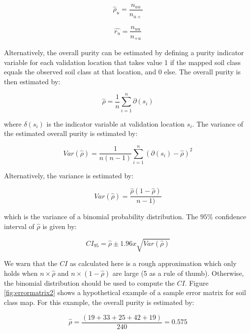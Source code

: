 \documentclass[10pt,b5paper,]{book}
\theoremstyle{definition}
\theoremstyle{definition}
\theoremstyle{definition}
\theoremstyle{remark}
\begin{document}
\begin{equation}
\hat{\rho}_u = \frac{ n_{uu}}{n_{u+}}
\end{equation}

\begin{equation}
\hat{r_u} = \frac{ n_{uu}}{n_{+u}}
\end{equation}

Alternatively, the overall purity can be estimated by defining a purity
indicator variable for each validation location that takes value 1 if
the mapped soil class equals the observed soil class at that location,
and 0 else. The overall purity is then estimated by:

\begin{equation}
\hat{\rho} = \frac{1}{n} \sum_{i=1}^{n} \partial(s_i)
\end{equation}

where \({\delta(s_i)}\) is the indicator variable at validation location
\(s_i\). The variance of the estimated overall purity is estimated by:

\begin{equation}
Var(\hat{\rho}) = \frac{1}{n(n-1)} \sum_{i=1}^{n} (\partial(s_i) - \hat{\rho})^2
\end{equation}

Alternatively, the variance is estimated by:

\begin{equation}
Var(\hat{\rho}) = \frac{\hat{\rho}(1 - \hat{\rho})}{n - 1)}
\end{equation}

which is the variance of a binomial probability distribution. The
\(95\%\) confidence interval of \(\hat{\rho}\) is given by:

\begin{equation}
CI_{95} = \hat{\rho} \pm 1.96x \sqrt{Var(\hat{\rho})}
\end{equation}

We warn that the \(CI\) as calculated here is a rough approximation
which only holds when \(n \times \hat{\rho}\) and
\(n \times (1 - \hat{\rho})\) are large (5 as a rule of thumb).
Otherwise, the binomial distribution should be used to compute the
\(CI\). Figure \ref{fig:errormatrix2} shows a hypothetical example of a
sample error matrix for soil class map. For this example, the overall
purity is estimated by:

\begin{equation}
\hat{\rho} = \frac{(19 + 33 + 25 + 42 + 19)}{240} = 0.575
\end{equation}
\end{document}
